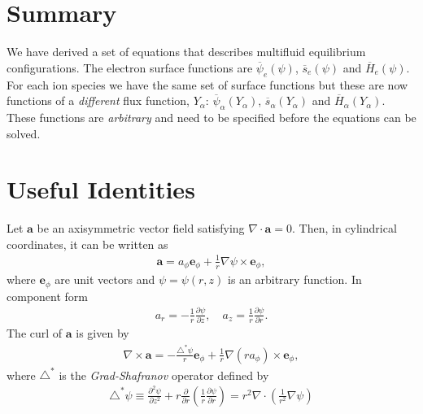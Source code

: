 \documentclass[11pt, reqno]{amsart}
\newcommand{\pfrac}[2]{\frac{\partial #1}{\partial #2}}
\newcommand{\mvec}[1]{\mathbf{#1}}
\newcommand{\eep}{\mvec{e}_\phi}
\theoremstyle{definition}
\begin{document}
\section{Summary}

We have derived a set of equations that describes multifluid
equilibrium configurations. The electron surface functions are
$\overline{\psi}_e(\psi)$, $\overline{s}_e(\psi)$ and
$\overline{H}_e(\psi)$. For each ion species we have the same set of
surface functions but these are now functions of a \emph{different}
flux function, $Y_\alpha$: $\overline{\psi}_\alpha(Y_\alpha)$,
$\overline{s}_\alpha(Y_\alpha)$ and
$\overline{H}_\alpha(Y_\alpha)$. These functions are \emph{arbitrary}
and need to be specified before the equations can be solved.

\appendix

\section{Useful Identities}
\label{apdx:identities}

Let $\mvec{a}$ be an axisymmetric vector field satisfying
$\nabla\cdot\mvec{a} = 0$. Then, in cylindrical coordinates, it can be
written as
\begin{align}
  \mvec{a} = a_\phi \eep + \frac{1}{r}\nabla\psi \times \eep, \label{id:divA}
\end{align}
where $\eep$ are unit vectors and $\psi = \psi(r,z)$ is an arbitrary
function. In component form
\begin{align}
  a_r = -\frac{1}{r} \pfrac{\psi}{z}, \quad 
  a_z = \frac{1}{r} \pfrac{\psi}{r}.
\end{align}
The curl of $\mvec{a}$ is given by
\begin{align}
  \nabla\times\mvec{a} = -\frac{\triangle^*\psi}{r}\eep
  + \frac{1}{r} \nabla(ra_\phi)\times\eep, \label{eq:curla}
\end{align}
where $\triangle^*$ is the \emph{Grad-Shafranov} operator defined by
\begin{align}
  \triangle^*\psi \equiv \frac{\partial^2 \psi}{\partial z^2}
  + r \frac{\partial}{\partial r}
  \left(\frac{1}{r} \pfrac{\psi}{r}\right)
    =
  r^2\nabla\cdot\left(\frac{1}{r^2}\nabla\psi\right)
\end{align}
\end{document}
